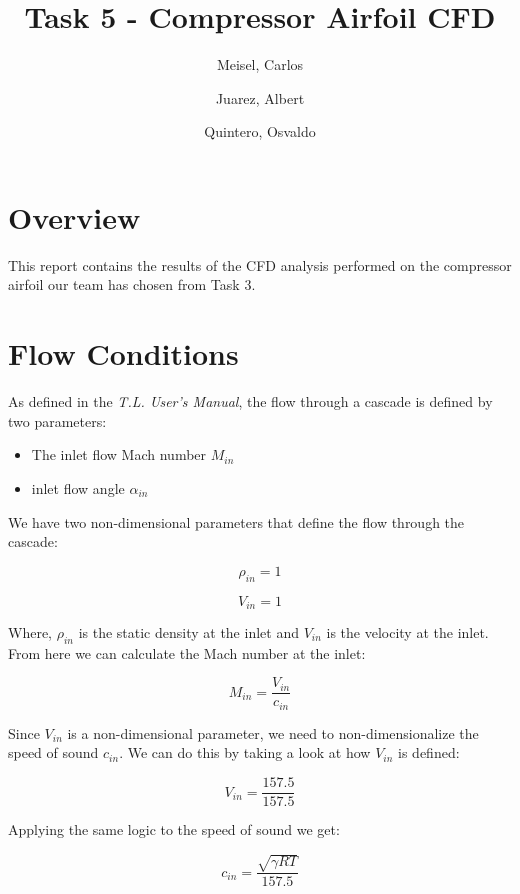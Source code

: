 \documentclass[12pt,english]{article}
\author{
    Meisel, Carlos \\
  \and
  Juarez, Albert\\
  \and
    Quintero, Osvaldo\\
}
\title{Task 5 - Compressor Airfoil CFD}
\begin{document}
  \maketitle

\section{Overview}
This report contains the results of the CFD analysis performed on the compressor airfoil our team has chosen from Task 3.


\section{Flow Conditions}
As defined in the \textit{T.L. User's Manual}, the flow through a cascade is defined by two parameters:
\begin{itemize}
\item The inlet flow Mach number $M_{in}$
\item inlet flow angle $\alpha_{in}$
\end{itemize}

We have two non-dimensional parameters that define the flow through the cascade:

\begin{equation}
\label{eq:non-dim rho}
\rho_{in} = 1
\end{equation}

\begin{equation}
\label{eq:non-dim v}
V_{in} = 1
\end{equation}

Where, $\rho_{in}$ is the static density at the inlet and $V_{in}$ is the velocity at the inlet.  
From here we can calculate the Mach number at the inlet:

\begin{equation}
\label{eq:inlet mach}
M_{in} = \frac{V_{in}}{c_{in}}
\end{equation}

Since $V_{in}$ is a non-dimensional parameter, we need to non-dimensionalize the speed of sound $c_{in}$. 
We can do this by taking a look at how $V_{in}$ is defined:

\begin{equation}
\label{eq:def inlet velocity}
V_{in} = \frac{157.5}{157.5}
\end{equation}

Applying the same logic to the speed of sound we get:

\begin{equation}
\label{eq:def inlet speed of sound}
c_{in} = \frac{\sqrt{\gamma R T}}{157.5}
\end{equation}
\end{document}
